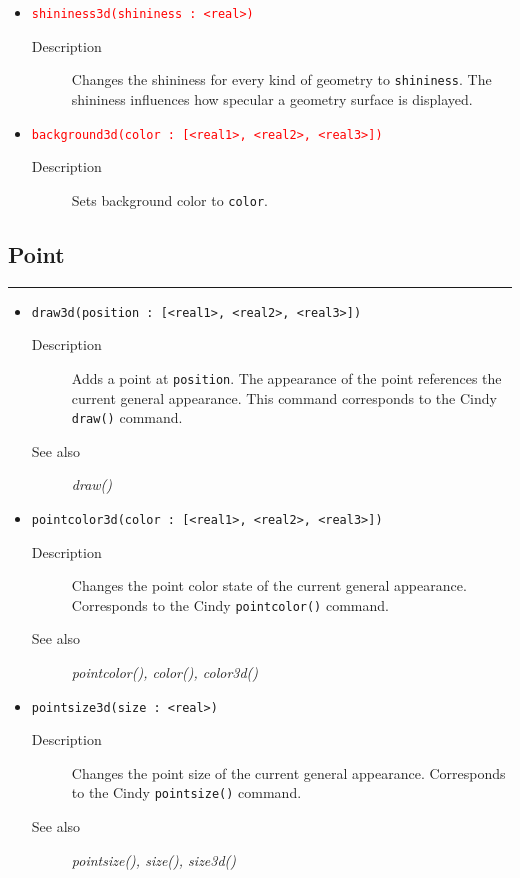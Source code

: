 \documentclass[10pt,a4widepaper]{scrartcl}
\newcommand{\csubsection}[1]{\subsection*{#1}\vspace{-0.55cm}\textcolor{CBlue}{\rule[1ex]{\textwidth}{0.4pt}}}
\newcommand{\cBlue}[1]{\textcolor{CBlue}{\texttt{#1}}}
\newcommand{\cRed}[1]{\textcolor{red}{\texttt{#1}}}
\newcommand{\desc}{\item[Description]}
\newcommand{\salso}{\item[See also]}
\begin{document}
\begin{itemize}
\item \cRed{shininess3d(shininess : <real>)}
\begin{description}
\item[Description] Changes the shininess for every kind of geometry to \texttt{shininess}. The shininess influences how specular a geometry surface is displayed.
\end{description}

\item \cRed{background3d(color : [<real1>, <real2>, <real3>])}
\begin{description}
\desc Sets background color to \texttt{color}.
\end{description}
\end{itemize}

\csubsection{Point}
\begin{itemize}

\item \cBlue{draw3d(position : [<real1>, <real2>, <real3>])}
\begin{description}
\desc Adds a point at \texttt{position}. The appearance of the point references the current general appearance. This command corresponds to the Cindy \texttt{draw()} command.
\salso \textit{draw()}
\end{description}

\item \cBlue{pointcolor3d(color : [<real1>, <real2>, <real3>])}
\begin{description}
\desc Changes the point color state of the current general appearance. Corresponds to the Cindy \texttt{pointcolor()} command.
\salso \textit{pointcolor(), color(), color3d()}
\end{description}

\item \cBlue{pointsize3d(size : <real>)}
\begin{description}
\desc Changes the point size of the current general appearance. Corresponds to the Cindy \texttt{pointsize()} command.
\salso \textit{pointsize(), size(), size3d()}
\end{description}
\end{itemize}
\end{document}
